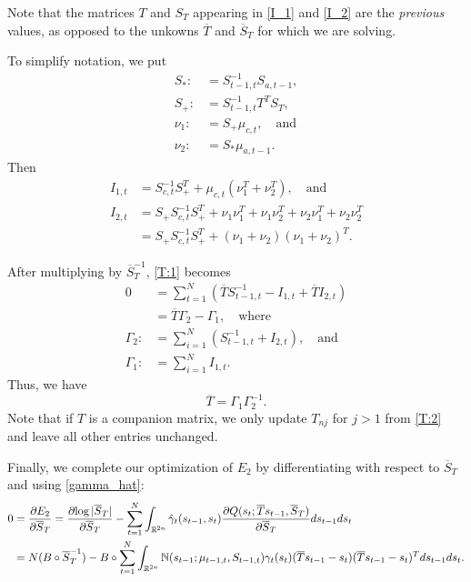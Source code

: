 \documentclass[12pt,leqno]{article}
\begin{document}
Note that the matrices $T$ and $S_T$ appearing in \eqref{I_1} and \eqref{I_2} are the {\em previous}
values, as opposed to the unkowns $\overline{T}$ and $\overline{S}_T$ for which we are solving.

To simplify notation, we put
\begin{align*}
S_* :&= S_{t-1,t}^{-1}S_{a,t-1},\\
S_+ :&= S_{t-1,t}^{-1}T^TS_T,\\
\nu_1 :&= S_+\mu_{c,t},\quad\text{and}\\
\nu_2 :&= S_*\mu_{a,t-1}.
\end{align*}
Then
\begin{align*}
  I_{1,t} &= S_{c,t}^{-1}S_+^T +\mu_{c,t}(\nu_1^T + \nu_2^T), \quad\text{and}\\
  I_{2,t} &= S_+S_{c,t}^{-1}S_+^T+\nu_1\nu_1^T + \nu_1\nu_2^T + \nu_2\nu_1^T + \nu_2\nu_2^T \\
      &= S_+S_{c,t}^{-1}S_+^T + (\nu_1+\nu_2)(\nu_1+\nu_2)^T.
\end{align*}

After multiplying by $\overline{S}_T^{-1}$, \eqref{T:1} becomes
\begin{align*}
 0 &= \sum_{t=1}^N\left(\overline{T}S_{t-1,t}^{-1} - I_{1,t} + \overline{T}I_{2,t}\right)\\
  &= \overline{T}\Gamma_2 - \Gamma_1, \quad\text{where} \\
  \Gamma_2 :&= \sum_{i=1}^N(S_{t-1,t}^{-1} + I_{2,t}),\quad\text{and}\\
  \Gamma_1 :&= \sum_{i=1}^NI_{1,t}.
\end{align*}
Thus,  we have
\begin{equation}\label{T:2}
  \overline{T} = \Gamma_1\Gamma_2^{-1}.
\end{equation}
Note that if $T$ is a companion matrix, we only update $T_{nj}$ for $j > 1$ from \eqref{T:2} and
leave all other entries unchanged.

Finally, we complete our optimization of $E_2$ by differentiating with respect to $\overline{S}_T$ and using \eqref{gamma_hat}:
\begin{equation}\label{Sigma_Tr:0}
  \begin{split}
  0 &= \frac{\partial{E_2}}{\partial{\overline{S}_T}} = \frac{\partial{\log|\overline{S}_T|}}{\partial\overline{S}_T}
  - \sum_{t=1}^N\int_{{\mathbb R}^{2n}}\hat{\gamma}_t(s_{t-1},s_t)\frac{\partial{Q(s_t;\overline{T}s_{t-1},\overline{S}_T)}}
  {\partial\overline{S}_T}ds_{t-1}ds_t \\
  &= N(B\circ\overline{S}_T^{-1}) -B\circ\sum_{t=1}^N\int_{{\mathbb R}^{2n}}{\mathbb N}(s_{t-1};\mu_{t-1,t},S_{t-1,t})
  \gamma_t(s_t)(\overline{T}s_{t-1}-s_t)(\overline{T}s_{t-1}-s_t)^Tds_{t-1}ds_t.
  \end{split}
\end{equation}
\end{document}
